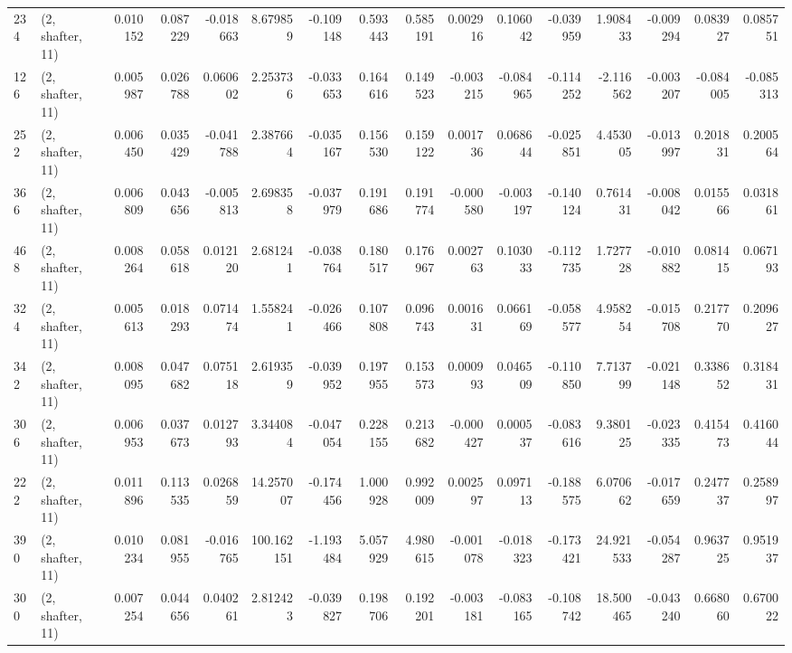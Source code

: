 \begin{tabular}{llrrrrrrrrrrrrrr}
234 &  (2, shafter, 11) &   0.010152 &  0.087229 & -0.018663 &    8.679859 & -0.109148 &   0.593443 &  0.585191 &  0.002916 &  0.106042 & -0.039959 &    1.908433 & -0.009294 &  0.083927 &  0.085751 \\
126 &  (2, shafter, 11) &   0.005987 &  0.026788 &  0.060602 &    2.253736 & -0.033653 &   0.164616 &  0.149523 & -0.003215 & -0.084965 & -0.114252 &   -2.116562 & -0.003207 & -0.084005 & -0.085313 \\
252 &  (2, shafter, 11) &   0.006450 &  0.035429 & -0.041788 &    2.387664 & -0.035167 &   0.156530 &  0.159122 &  0.001736 &  0.068644 & -0.025851 &    4.453005 & -0.013997 &  0.201831 &  0.200564 \\
366 &  (2, shafter, 11) &   0.006809 &  0.043656 & -0.005813 &    2.698358 & -0.037979 &   0.191686 &  0.191774 & -0.000580 & -0.003197 & -0.140124 &    0.761431 & -0.008042 &  0.015566 &  0.031861 \\
468 &  (2, shafter, 11) &   0.008264 &  0.058618 &  0.012120 &    2.681241 & -0.038764 &   0.180517 &  0.176967 &  0.002763 &  0.103033 & -0.112735 &    1.727728 & -0.010882 &  0.081415 &  0.067193 \\
324 &  (2, shafter, 11) &   0.005613 &  0.018293 &  0.071474 &    1.558241 & -0.026466 &   0.107808 &  0.096743 &  0.001631 &  0.066169 & -0.058577 &    4.958254 & -0.015708 &  0.217770 &  0.209627 \\
342 &  (2, shafter, 11) &   0.008095 &  0.047682 &  0.075118 &    2.619359 & -0.039952 &   0.197955 &  0.153573 &  0.000993 &  0.046509 & -0.110850 &    7.713799 & -0.021148 &  0.338652 &  0.318431 \\
306 &  (2, shafter, 11) &   0.006953 &  0.037673 &  0.012793 &    3.344084 & -0.047054 &   0.228155 &  0.213682 & -0.000427 &  0.000537 & -0.083616 &    9.380125 & -0.023335 &  0.415473 &  0.416044 \\
222 &  (2, shafter, 11) &   0.011896 &  0.113535 &  0.026859 &   14.257007 & -0.174456 &   1.000928 &  0.992009 &  0.002597 &  0.097113 & -0.188575 &    6.070662 & -0.017659 &  0.247737 &  0.258997 \\
390 &  (2, shafter, 11) &   0.010234 &  0.081955 & -0.016765 &  100.162151 & -1.193484 &   5.057929 &  4.980615 & -0.001078 & -0.018323 & -0.173421 &   24.921533 & -0.054287 &  0.963725 &  0.951937 \\
300 &  (2, shafter, 11) &   0.007254 &  0.044656 &  0.040261 &    2.812423 & -0.039827 &   0.198706 &  0.192201 & -0.003181 & -0.083165 & -0.108742 &   18.500465 & -0.043240 &  0.668060 &  0.670022 \\

\end{tabular}
